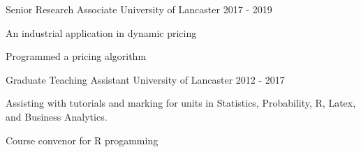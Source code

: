 \begin{cventries}
      
    \cventry
    {Senior Research Associate}
    {University of Lancaster}
    {}
    {2017 - 2019}
    {
      \begin{cvitems}
        \item An industrial application in dynamic pricing
        \item Programmed a pricing algorithm
      \end{cvitems}
    }  
      
    \cventry
    {Graduate Teaching Assistant}
    {University of Lancaster}
    {}
    {2012 - 2017}
    {
      \begin{cvitems}
        \item Assisting with tutorials and marking for units in Statistics, Probability, R, Latex, and Business Analytics. 
         \item Course convenor for R progamming
      \end{cvitems}
    }
\end{cventries}
